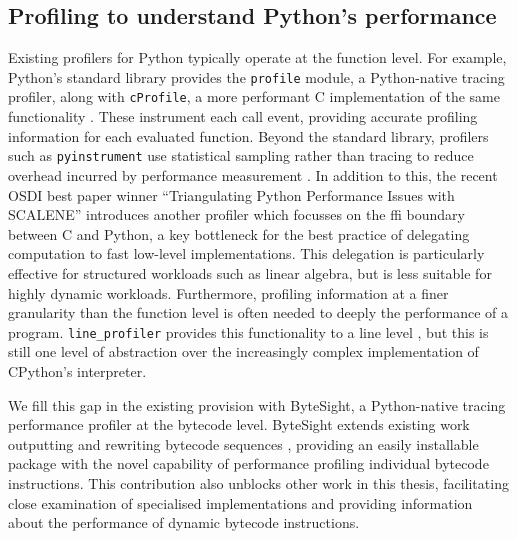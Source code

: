 \subsection{Profiling to understand Python's performance}
\label{sec:python-performance-profiling}

Existing profilers for Python typically operate at the function level.
For example, Python's standard library provides the \texttt{profile} module, a Python-native tracing profiler, along with \texttt{cProfile}, a more performant C implementation of the same functionality \cite{pythonsoftwarefoundationPythonProfilers}. These instrument each call event, providing accurate profiling information for each evaluated function.
Beyond the standard library, profilers such as \texttt{pyinstrument} use statistical sampling rather than tracing to reduce overhead incurred by performance measurement \cite{rickerbyPyinstrument2025}.
In addition to this, the recent OSDI best paper winner ``Triangulating Python Performance Issues with SCALENE'' \cite{bergerTriangulatingPythonPerformance2023a} introduces another profiler which focusses on the \ac{ffi} boundary between C and Python, a key bottleneck for the best practice of delegating computation to fast low-level implementations.
This delegation is particularly effective for structured workloads such as linear algebra, but is less suitable for highly dynamic workloads.
Furthermore, profiling information at a finer granularity than the function level is often needed to deeply the performance of a program.
\texttt{line\_profiler} provides this functionality to a line level \cite{robertkernPyutilsLine_profiler2025}, but this is still one level of abstraction over the increasingly complex implementation of CPython's interpreter.

We fill this gap in the existing provision with ByteSight, a Python-native tracing performance profiler at the bytecode level.
ByteSight extends existing work outputting and rewriting bytecode sequences \cite{0xecCodingReversingHacking2017} \cite{clementrouaultUnderstandingPythonExecution} \cite{nedbatchelderWickedHackPython2008}, providing an easily installable package with the novel capability of performance profiling individual bytecode instructions.
This contribution also unblocks other work in this thesis, facilitating close examination of specialised implementations and providing information about the performance of dynamic bytecode instructions.



